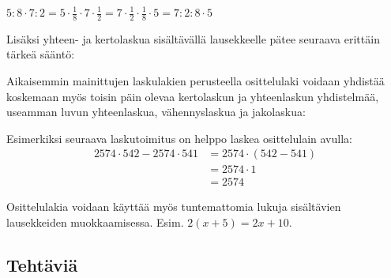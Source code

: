 \begin{esimerkki}
$5:8\cdot 7:2=5\cdot\frac18\cdot 7\cdot\frac12=7\cdot \frac12\cdot\frac18\cdot 5=7:2:8\cdot 5$
\end{esimerkki} 

Lisäksi yhteen- ja kertolaskua sisältävällä lausekkeelle pätee seuraava erittäin tärkeä sääntö:


Aikaisemmin mainittujen laskulakien perusteella osittelulaki voidaan yhdistää koskemaan myös toisin päin olevaa kertolaskun ja yhteenlaskun yhdistelmää, useamman luvun yhteenlaskua, vähennyslaskua ja jakolaskua:


Esimerkiksi seuraava laskutoimitus on helppo laskea osittelulain avulla: 
     \begin{align*}
	  2574\cdot 542-2574\cdot 541 &= 2574\cdot (542-541)  \\ &= 2574\cdot 1 \\ &= 2574
     \end{align*}


Osittelulakia voidaan käyttää myös tuntemattomia lukuja sisältävien lausekkeiden muokkaamisessa. Esim. $2(x+5)=2x+10$.
    

\subsection*{Tehtäviä}
   

